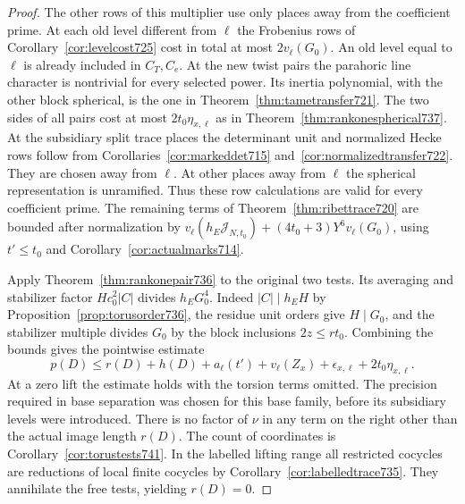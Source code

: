 \documentclass[a4paper,11pt]{article}
\theoremstyle{definition}
\theoremstyle{remark}
\numberwithin{equation}{section}
\begin{document}
\begin{proof}
The other rows of this multiplier use only places away from
the coefficient prime. At each old level different from
\(\ell\) the Frobenius rows of Corollary~\ref{cor:levelcost725}
cost in total at most \(2v_\ell(G_0)\). An old level equal to
\(\ell\) is already included in \(C_T,C_e\). At the new twist
pairs the parahoric line character is nontrivial for every
selected power. Its inertia polynomial, with the other block
spherical, is the one in Theorem~\ref{thm:tametransfer721}.
The two sides of all pairs cost at most \(2t_0\eta_{x,\ell}\)
as in Theorem~\ref{thm:rankonespherical737}. At the subsidiary
split trace places the determinant unit and normalized Hecke
rows follow from Corollaries~\ref{cor:markeddet715}
and~\ref{cor:normalizedtransfer722}. They are chosen away from
\(\ell\). At other places away from \(\ell\) the spherical
representation is unramified. Thus these row calculations are
valid for every coefficient prime. The remaining terms of
Theorem~\ref{thm:ribettrace720} are bounded after normalization
by \(v_\ell(h_E\mathcal J_{N,t_0})+(4t_0+3)Y^6v_\ell(G_0)\),
using \(t'\le t_0\) and Corollary~\ref{cor:actualmarks714}.

Apply Theorem~\ref{thm:rankonepair736} to the original two
tests. Its averaging and stabilizer factor \(Hc_0^2|C|\)
divides \(h_E G_0^4\). Indeed \(|C|\mid h_E H\) by
Proposition~\ref{prop:torusorder736}, the residue unit orders
give \(H\mid G_0\), and the stabilizer multiple divides \(G_0\)
by the block inclusions \(2z\le r t_0\). Combining the bounds
gives the pointwise estimate
\[
   p(D)\le r(D)+h(D)+a_\ell(t')+v_\ell(Z_x)
                          +\epsilon_{x,\ell}+2t_0\eta_{x,\ell}.
 \tag{11}\label{eq:periodpoint742}
\]
At a zero lift the estimate holds with the torsion terms omitted.
The precision required in base separation was chosen for this
base family, before its subsidiary levels were introduced.
There is no factor of \(\nu\) in any term on the right other
than the actual image length \(r(D)\). The count of coordinates
is Corollary~\ref{cor:torustests741}. In the labelled lifting
range all restricted cocycles are reductions of local finite
cocycles by Corollary~\ref{cor:labelledtrace735}. They annihilate
the free tests, yielding \(r(D)=0\).


\end{proof}
\end{document}
